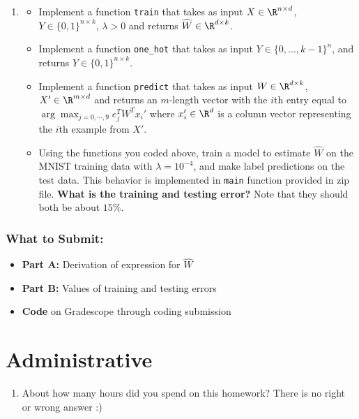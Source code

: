 \documentclass{article}
\begin{document}
\begin{aprob}
\begin{enumerate}
        \item {} 
        \begin{itemize}
            \item Implement a function \verb|train| that takes as input $X \in\R^{n \times d}$, $Y \in \{0,1\}^{n \times k}$, $\lambda > 0$ and returns $\widehat{W} \in \R^{d \times k}$.
            \item Implement a function \verb|one_hot| that takes as input $Y \in \{0, ..., k-1\}^{n}$, and returns $Y \in \{0,1\}^{n \times k}$.
            \item Implement a function  \verb|predict| that takes as input $W \in \R^{d \times k}$, $X' \in\R^{m \times d}$ and returns an $m$-length vector with the $i$th entry equal to $\arg\max_{j=0,\cdots,9} e_j^T W^T x_i'$ where $x_i' \in \R^d$ is a column vector representing the $i$th example from $X'$.
            \item Using the functions you coded above, train a model to estimate $\widehat{W}$ on the MNIST training data with $\lambda = 10^{-4}$, and make label predictions on the test data. This behavior is implemented in \verb|main| function provided in zip file. {\bf What is the training and testing error?} Note that they should both be about $15\%$. 
        \end{itemize}
    \end{enumerate}
    
    \subsubsection*{What to Submit:}
    \begin{itemize}
        \item \textbf{Part A:} Derivation of expression for $\widehat{W}$
        \item \textbf{Part B:} Values of training and testing errors
        \item \textbf{Code} on Gradescope through coding submission
    \end{itemize}
\end{aprob}

\section*{Administrative}
\begin{aprob}
\begin{enumerate}
    \item {} About how many hours did you spend on this homework? There is no right or wrong answer :)
\end{enumerate}

\end{aprob}
\end{document}
